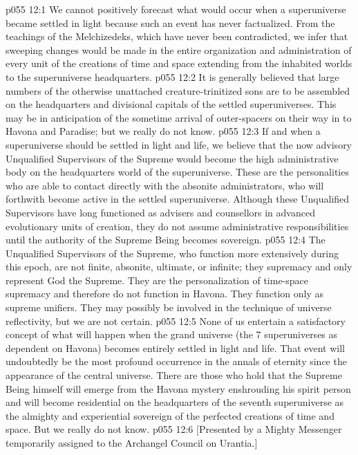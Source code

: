 \vs p055 12:1 We cannot positively forecast what would occur when a superuniverse became settled in light because such an event has never factualized. From the teachings of the Melchizedeks, which have never been contradicted, we infer that sweeping changes would be made in the entire organization and administration of every unit of the creations of time and space extending from the inhabited worlds to the superuniverse headquarters.
\vs p055 12:2 It is generally believed that large numbers of the otherwise unattached creature\hyp{}trinitized sons are to be assembled on the headquarters and divisional capitals of the settled superuniverses. This may be in anticipation of the sometime arrival of outer\hyp{}spacers on their way in to Havona and Paradise; but we really do not know.
\vs p055 12:3 \pc If and when a superuniverse should be settled in light and life, we believe that the now advisory Unqualified Supervisors of the Supreme would become the high administrative body on the headquarters world of the superuniverse. These are the personalities who are able to contact directly with the absonite administrators, who will forthwith become active in the settled superuniverse. Although these Unqualified Supervisors have long functioned as advisers and counsellors in advanced evolutionary units of creation, they do not assume administrative responsibilities until the authority of the Supreme Being becomes sovereign.
\vs p055 12:4 The Unqualified Supervisors of the Supreme, who function more extensively during this epoch, are not finite, absonite, ultimate, or infinite; they  supremacy and only represent God the Supreme. They are the personalization of time\hyp{}space supremacy and therefore do not function in Havona. They function only as supreme unifiers. They may possibly be involved in the technique of universe reflectivity, but we are not certain.
\vs p055 12:5 \pc None of us entertain a satisfactory concept of what will happen when the grand universe (the 7 superuniverses as dependent on Havona) becomes entirely settled in light and life. That event will undoubtedly be the most profound occurrence in the annals of eternity since the appearance of the central universe. There are those who hold that the Supreme Being himself will emerge from the Havona mystery enshrouding his spirit person and will become residential on the headquarters of the seventh superuniverse as the almighty and experiential sovereign of the perfected creations of time and space. But we really do not know.
\vsetoff
\vs p055 12:6 [Presented by a Mighty Messenger temporarily assigned to the Archangel Council on Urantia.]
\quizlink
